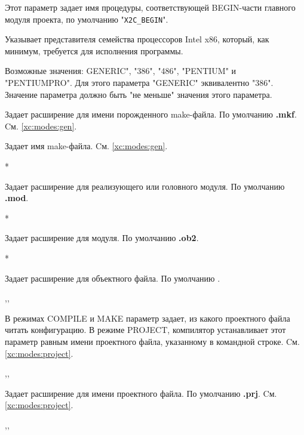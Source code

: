 \begin{description}
Этот параметр задает имя процедуры, соответствующей BEGIN-части главного 
модуля проекта, по умолчанию "\verb'X2C_BEGIN'".
\fi

\ifgencode
{}
        \MLBegin{}\ModeC{}\MLEnd{}

Указывает представителя семейства процессоров
Intel x86, который, как минимум, требуется для исполнения программы.

Возможные значения: GENERIC", "386", "486", "PENTIUM" и
        "PENTIUMPRO". Для этого параметра "GENERIC" эквивалентно
        "386". Значение параметра  должно быть 
"не меньше" значения этого параметра.
\fi

        \MLBegin{}\ModeG{}\MLEnd{}

Задает расширение для имени порожденного make-файла. По умолчанию
{\bf.mkf}. Cм. \ref{xc:modes:gen}.

        \MLBegin{}\ModeG{}\MLEnd{}

Задает имя make-файла.
Cм. \ref{xc:modes:gen}.

        \MLBegin{}*\MLEnd{}

Задает расширение для \mt{} реализующего или головного модуля.
По умолчанию {\bf .mod}.

        \MLBegin{}*\MLEnd{}

Задает расширение для \ot{} модуля.
По умолчанию {\bf .ob2}.

        \MLBegin{}*\MLEnd{}

Задает расширение для объектного файла.
По умолчанию {\bf \dotObj}.


        \MLBegin{}\ModeC{},\ModeM{},\ModeP{}\MLEnd{}

В режимах COMPILE и MAKE параметр задает, из какого проектного файла 
читать конфигурацию.
В режиме PROJECT, компилятор устанавливает этот параметр равным
имени проектного файла, указанному в командной строке.
        Cм. \ref{xc:modes:project}.

        \MLBegin{}\ModeC{},\ModeM{},\ModeP{}\MLEnd{}

Задает расширение для имени проектного файла.
По умолчанию {\bf .prj}. Cм. \ref{xc:modes:project}.

        \MLBegin{}\ModeC{},\ModeM{},\ModeP{}\MLEnd{}


\end{description}
